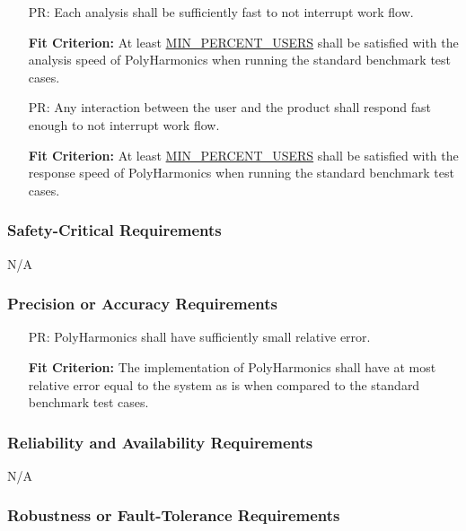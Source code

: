 \documentclass[12pt]{article}
\newcounter{perfnum}
\newcommand{\progname}{PolyHarmonics}
\begin{document}
\noindent \begin{itemize}
\item[PR\refstepcounter{perfnum}\theperfnum\label{NF_SL1}:] Each analysis
 shall be sufficiently fast to not interrupt work flow.

  \textbf{Fit Criterion:} At least \hyperref[AppendA]{MIN\_PERCENT\_USERS} 
  shall be satisfied with the analysis speed of \progname{} when running the
  standard benchmark test cases.
  
\item[PR\refstepcounter{perfnum}\theperfnum\label{NF_SL2}:]Any interaction
  between the user and the product shall respond fast enough to not interrupt 
  work flow.

  \textbf{Fit Criterion:} At least \hyperref[AppendA]{MIN\_PERCENT\_USERS} 
  shall be satisfied with the response speed of \progname{} when running the
  standard benchmark test cases.
\end{itemize}

\subsubsection{Safety-Critical Requirements}

N/A

\subsubsection{Precision or Accuracy Requirements}

\noindent \begin{itemize}
\item[PR\refstepcounter{perfnum}\theperfnum\label{NF_PA}:] \progname{} shall
  have sufficiently small relative error.

  \textbf{Fit Criterion:} The implementation of \progname{} shall have at most
  relative error equal to the system as is when compared to the standard
  benchmark test cases.
\end{itemize}

\subsubsection{Reliability and Availability Requirements}

N/A

\subsubsection{Robustness or Fault-Tolerance Requirements}
\end{document}
